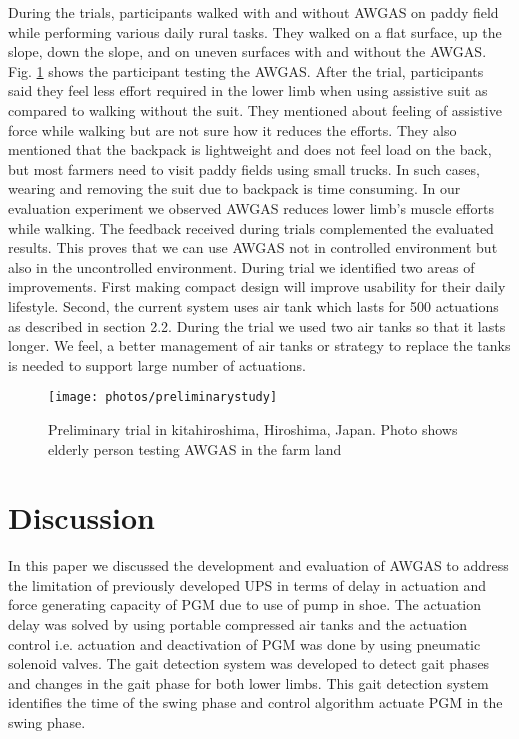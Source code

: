 \documentclass[paper,JRM,paper]{jaciiiarticle}
\begin{document}
During the trials, participants walked with and without AWGAS on paddy field while performing various daily rural tasks. They walked on a flat surface, up the slope, down the slope, and on uneven surfaces with and without the AWGAS. Fig. \ref{fig:preliminarystudy} shows the participant testing the AWGAS. After the trial, participants said they feel less effort required in the lower limb when using assistive suit as compared to walking without the suit. They mentioned about feeling of assistive force while walking but are not sure how it reduces the efforts. They also mentioned that the backpack is lightweight and does not feel load on the back, but most farmers need to visit paddy fields using small trucks. In such cases, wearing and removing the suit due to backpack is time consuming. In our evaluation experiment we observed AWGAS reduces lower limb’s muscle efforts while walking. The feedback received during trials complemented the evaluated results. This proves that we can use AWGAS not in controlled environment but also in the uncontrolled environment. During trial we identified two areas of improvements. First making compact design will improve usability for their daily lifestyle. Second, the current system uses air tank which lasts for 500 actuations as described in section 2.2. During the trial we used two air tanks so that it lasts longer. We feel, a better management of air tanks or strategy to replace the tanks is needed to support large number of actuations. 


\begin{figure}[h]
	\centering
	\texttt{[image: photos/preliminarystudy]}
	\caption{Preliminary trial in kitahiroshima, Hiroshima, Japan. Photo shows elderly person testing AWGAS in the farm land}
	\label{fig:preliminarystudy}
\end{figure}

\section{Discussion}
In this paper we discussed the development and evaluation of AWGAS to address the limitation of previously developed UPS in terms of delay in actuation and force generating capacity of PGM due to use of pump in shoe. The actuation delay was solved by using portable compressed air tanks and the actuation control i.e. actuation and deactivation of PGM was done by using pneumatic solenoid valves. The gait detection system was developed to detect gait phases and changes in the gait phase for both lower limbs. This gait detection system identifies the time of the swing phase and control algorithm actuate PGM in the swing phase. 
\end{document}
